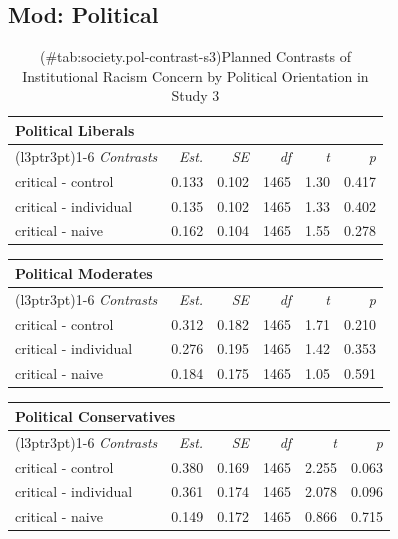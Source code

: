 \documentclass[
]{book}
\begin{document}
\hypertarget{mod-political-19}{%
\subsection{Mod: Political}\label{mod-political-19}}

\begin{table}

\caption{(\#tab:society.pol-contrast-s3)Planned Contrasts of Institutional Racism Concern by Political Orientation in Study 3}
\centering
\begin{tabular}[t]{lrrrrr}
\toprule
\multicolumn{6}{l}{Political Liberals} \\
\cmidrule(l{3pt}r{3pt}){1-6}
\em{Contrasts} & \em{Est.} & \em{SE} & \em{df} & \em{t} & \em{p}\\
\midrule
critical - control & 0.133 & 0.102 & 1465 & 1.30 & 0.417\\
critical - individual & 0.135 & 0.102 & 1465 & 1.33 & 0.402\\
critical - naive & 0.162 & 0.104 & 1465 & 1.55 & 0.278\\
\bottomrule
\end{tabular}
\end{table}

\begin{table}
\centering
\fontsize{13}{15}\selectfont
\begin{tabular}{lrrrrr}
\toprule
\multicolumn{6}{l}{Political Moderates} \\
\cmidrule(l{3pt}r{3pt}){1-6}
\em{Contrasts} & \em{Est.} & \em{SE} & \em{df} & \em{t} & \em{p}\\
\midrule
critical - control & 0.312 & 0.182 & 1465 & 1.71 & 0.210\\
critical - individual & 0.276 & 0.195 & 1465 & 1.42 & 0.353\\
critical - naive & 0.184 & 0.175 & 1465 & 1.05 & 0.591\\
\bottomrule
\end{tabular}
\end{table}

\begin{table}
\centering
\fontsize{13}{15}\selectfont
\begin{tabular}{lrrrrr}
\toprule
\multicolumn{6}{l}{Political Conservatives} \\
\cmidrule(l{3pt}r{3pt}){1-6}
\em{Contrasts} & \em{Est.} & \em{SE} & \em{df} & \em{t} & \em{p}\\
\midrule
critical - control & 0.380 & 0.169 & 1465 & 2.255 & 0.063\\
critical - individual & 0.361 & 0.174 & 1465 & 2.078 & 0.096\\
critical - naive & 0.149 & 0.172 & 1465 & 0.866 & 0.715\\
\bottomrule
\end{tabular}
\end{table}
\end{document}
